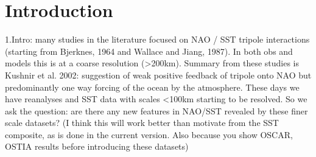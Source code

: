 






\section{Introduction}

1.Intro: many studies in the literature focused on NAO / SST tripole interactions (starting from Bjerknes, 1964 and Wallace and Jiang, 1987). In both obs and models this is at a coarse resolution (>200km). Summary from these studies is Kushnir et al. 2002: suggestion of weak positive feedback of tripole onto NAO but predominantly one way forcing of the ocean by the atmosphere. These days we have reanalyses and SST data with scales <100km starting to be resolved. So we ask the question: are there any new features in NAO/SST revealed by these finer scale datasets?  (I think this will work better than motivate from the SST composite, as is done in the current version. Also because you show OSCAR, OSTIA results before introducing these datasets)  


